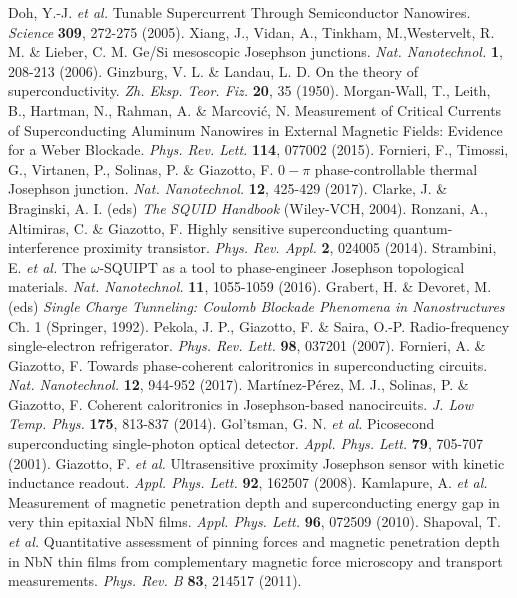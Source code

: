 \documentclass[prl,twocolumn,reprint,graphicx,showpacs,superscriptaddress,floatfix]{revtex4-1}
\begin{document}
\begin{thebibliography}{50}
	Doh, Y.-J. \emph{et al.} Tunable Supercurrent Through Semiconductor Nanowires. \emph{Science} \textbf{309}, 272-275 (2005).
	Xiang, J., Vidan, A., Tinkham, M.,Westervelt, R. M. \& Lieber, C. M. Ge/Si mesoscopic Josephson junctions. \emph{Nat. Nanotechnol.} \textbf{1}, 208-213 (2006).
	Ginzburg, V. L. \& Landau, L. D. On the theory of superconductivity. \emph{Zh. Eksp. Teor. Fiz.} \textbf{20}, 35 (1950).
	Morgan-Wall, T., Leith, B., Hartman, N., Rahman, A. \& Marcovi{\'c}, N. Measurement of Critical Currents of Superconducting Aluminum Nanowires in External Magnetic Fields: Evidence for a Weber Blockade. \emph{Phys. Rev. Lett.} \textbf{114}, 077002 (2015).
	Fornieri, F., Timossi, G., Virtanen, P., Solinas, P. \& Giazotto, F. $0-\pi$ phase-controllable thermal Josephson junction. \emph{Nat. Nanotechnol.} \textbf{12}, 425-429 (2017).	
Clarke, J. \& Braginski, A. I. (eds) \emph{The SQUID Handbook} (Wiley-VCH, 2004).
	Ronzani, A., Altimiras, C. \& Giazotto, F. Highly sensitive superconducting quantum-interference proximity transistor. \emph{Phys. Rev. Appl.} \textbf{2}, 024005 (2014).
	Strambini, E. \emph{et al.} The $\omega$-SQUIPT as a tool to phase-engineer Josephson topological materials. \emph{Nat. Nanotechnol.} \textbf{11}, 1055-1059 (2016).
	Grabert, H. \& Devoret, M. (eds) \emph{Single Charge Tunneling: Coulomb Blockade Phenomena in Nanostructures} Ch. 1
(Springer, 1992).
	Pekola, J. P., Giazotto, F. \& Saira, O.-P. Radio-frequency single-electron refrigerator. \emph{Phys. Rev. Lett. } \textbf{98}, 037201 (2007).
Fornieri, A. \& Giazotto, F. Towards phase-coherent caloritronics in superconducting circuits. \emph{Nat. Nanotechnol.} \textbf{12}, 944-952 (2017).
	Mart\'inez-P\'erez, M. J., Solinas, P. \& Giazotto, F. Coherent caloritronics in Josephson-based nanocircuits. \emph{J. Low Temp. Phys. } \textbf{175}, 813-837 (2014).
Gol'tsman, G. N. \emph{et al.} Picosecond superconducting single-photon optical detector. \emph{Appl. Phys. Lett.} \textbf{79}, 705-707 (2001).
	Giazotto, F. \emph{et al.} Ultrasensitive proximity Josephson sensor with kinetic inductance readout. \emph{Appl. Phys. Lett.} \textbf{92}, 162507 (2008).
	Kamlapure, A. \emph{et al.} Measurement of magnetic penetration depth and superconducting energy gap in very thin epitaxial NbN films. \emph{Appl. Phys. Lett.} \textbf{96}, 072509 (2010). 
	Shapoval, T. \emph{et al.} Quantitative assessment of pinning forces and magnetic penetration depth in NbN thin films from complementary magnetic force microscopy and transport measurements. \emph{Phys. Rev. B} \textbf{83}, 214517 (2011).
\end{thebibliography}
\end{document}
